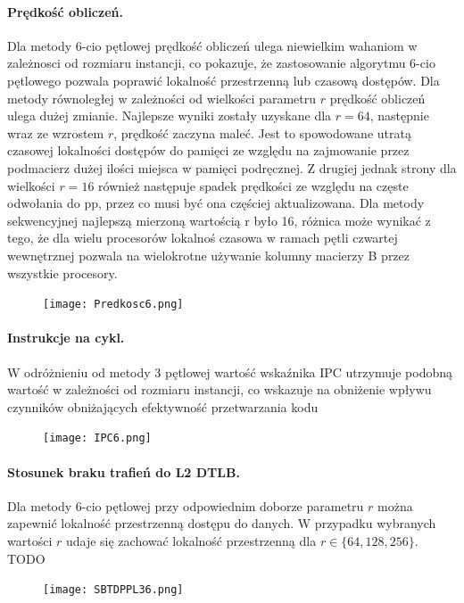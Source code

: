 \documentclass{scrartcl}
\begin{document}
\paragraph{Prędkość obliczeń.} Dla metody 6-cio pętlowej prędkość obliczeń ulega niewielkim wahaniom w zależnosci od rozmiaru instancji, co pokazuje, że zastosowanie algorytmu 6-cio pętlowego pozwala poprawić lokalność przestrzenną lub czasową dostępów. Dla metody równoległej w zależności od wielkości parametru $r$ prędkość obliczeń ulega dużej zmianie. Najlepsze wyniki zostały uzyskane dla $r = 64$, następnie wraz ze wzrostem $r$, prędkość zaczyna maleć. Jest to spowodowane utratą czasowej lokalności dostępów do pamięci ze względu na zajmowanie przez podmacierz dużej ilości miejsca w pamięci podręcznej. Z drugiej jednak strony dla wielkości $r = 16$ również następuje spadek prędkości ze względu na częste odwołania do pp, przez co musi być ona częściej aktualizowana. Dla metody sekwencyjnej najlepszą mierzoną wartością r było 16, różnica może wynikać z tego, że dla wielu procesorów lokalnoś czasowa w ramach pętli czwartej wewnętrznej pozwala na wielokrotne używanie kolumny macierzy B przez wszystkie procesory.
\begin{figure}[H]
\texttt{[image: Predkosc6.png]}\\
\end{figure}

\paragraph{Instrukcje na cykl.} W odróżnieniu od metody 3 pętlowej wartość wskaźnika IPC utrzymuje podobną wartość w zależności od rozmiaru instancji, co wskazuje na obniżenie wpływu czynników obniżających efektywność przetwarzania kodu
\begin{figure}[H]
\texttt{[image: IPC6.png]}\\
\end{figure}

\paragraph{Stosunek braku trafień do L2 DTLB.} Dla metody 6-cio pętlowej przy odpowiednim doborze parametru $r$ można zapewnić lokalność przestrzenną dostępu do danych. W przypadku wybranych wartości $r$ udaje się zachować lokalność przestrzenną dla $r \in \{64, 128, 256\}$. TODO
\begin{figure}[H]
\texttt{[image: SBTDPPL36.png]}\\
\end{figure}
\end{document}
